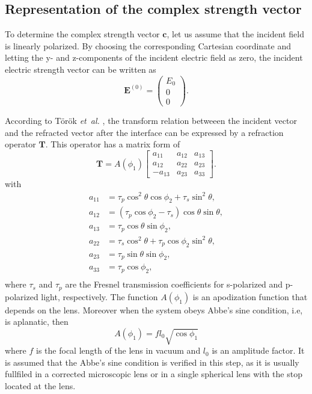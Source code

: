 \documentclass[9pt,twocolumn,twoside]{osajnl}
\begin{document}
\subsection{Representation of the complex strength vector}
To determine the complex strength vector $\mathbf{c}$, let us assume that the incident field is linearly polarized. By choosing the corresponding Cartesian coordinate and letting the y- and z-components of the incident electric field as zero, the incident electric strength vector can be written as
\begin{equation}\label{eq:18}
	\mathbf{E}^{(0)}=
	\begin{pmatrix}
		E_0\\
		0\\
		0
	\end{pmatrix}.
\end{equation}

According to T\"or\"ok \emph{et~al.} \cite{torok1995electromagnetic}, the transform relation betweeen the incident vector and the refracted vector after the interface can be expressed by a refraction operator $\mathbf{T}$. This operator has a matrix form of 
	\begin{equation}\label{eq:19}
		\mathbf{T}=A(\phi_1)
		\begin{bmatrix}
			a_{11} & a_{12} & a_{13}\\
			a_{12} & a_{22} & a_{23}\\
			-a_{13} & a_{23} & a_{33}
		\end{bmatrix}.
	\end{equation}	
with
\begin{equation*}
	\begin{aligned}
		a_{11} &= \tau_p\cos^2\theta\cos\phi_2+\tau_s\sin^2\theta,\\
		a_{12} &= (\tau_p\cos\phi_2-\tau_s)\cos\theta\sin\theta,\\
		a_{13} &= \tau_p\cos\theta\sin\phi_2,\\
		a_{22} &= \tau_s\cos^2\theta+\tau_p\cos\phi_2\sin^2\theta,\\
		a_{23} &= \tau_p\sin\theta\sin\phi_2,\\
		a_{33} &= \tau_p\cos\phi_2,\\	
	\end{aligned}	
\end{equation*}
where $\tau_s$ and $\tau_p$ are the Fresnel transmission coefficients for s-polarized and p-polarized light, respectively. The function $A(\phi_1)$ is an apodization function that depends on the lens. Moreover when the system obeys Abbe's sine condition, i.e, is aplanatic, then
\begin{equation}\label{eq:20}
	A(\phi_1)=f l_0\sqrt{\cos\phi_1}
\end{equation}
where $f$ is the focal length of the lens in vacuum and $l_0$ is an amplitude factor. It is assumed that the Abbe's sine condition is verified in this step, as it is usually fullfiled in a corrected microscopic lens or in a single spherical lens with the stop located at the lens.
\end{document}
